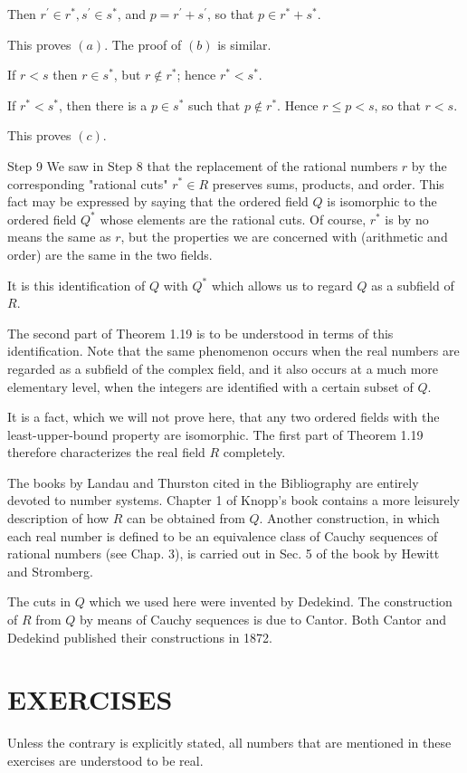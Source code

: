 \documentclass[10pt]{article}
\begin{document}
Then $r^{\prime} \in r^{*}, s^{\prime} \in s^{*}$, and $p=r^{\prime}+s^{\prime}$, so that $p \in r^{*}+s^{*}$.

This proves $(a)$. The proof of $(b)$ is similar.

If $r<s$ then $r \in s^{*}$, but $r \notin r^{*}$; hence $r^{*}<s^{*}$.

If $r^{*}<s^{*}$, then there is a $p \in s^{*}$ such that $p \notin r^{*}$. Hence $r \leq p<s$, so that $r<s$.

This proves $(c)$.

Step 9 We saw in Step 8 that the replacement of the rational numbers $r$ by the corresponding "rational cuts" $r^{*} \in R$ preserves sums, products, and order. This fact may be expressed by saying that the ordered field $Q$ is isomorphic to the ordered field $Q^{*}$ whose elements are the rational cuts. Of course, $r^{*}$ is by no means the same as $r$, but the properties we are concerned with (arithmetic and order) are the same in the two fields.

It is this identification of $Q$ with $Q^{*}$ which allows us to regard $Q$ as a subfield of $R$.

The second part of Theorem 1.19 is to be understood in terms of this identification. Note that the same phenomenon occurs when the real numbers are regarded as a subfield of the complex field, and it also occurs at a much more elementary level, when the integers are identified with a certain subset of $Q$.

It is a fact, which we will not prove here, that any two ordered fields with the least-upper-bound property are isomorphic. The first part of Theorem 1.19 therefore characterizes the real field $R$ completely.

The books by Landau and Thurston cited in the Bibliography are entirely devoted to number systems. Chapter 1 of Knopp's book contains a more leisurely description of how $R$ can be obtained from $Q$. Another construction, in which each real number is defined to be an equivalence class of Cauchy sequences of rational numbers (see Chap. 3), is carried out in Sec. 5 of the book by Hewitt and Stromberg.

The cuts in $Q$ which we used here were invented by Dedekind. The construction of $R$ from $Q$ by means of Cauchy sequences is due to Cantor. Both Cantor and Dedekind published their constructions in 1872.

\section{EXERCISES}
Unless the contrary is explicitly stated, all numbers that are mentioned in these exercises are understood to be real.
\end{document}
